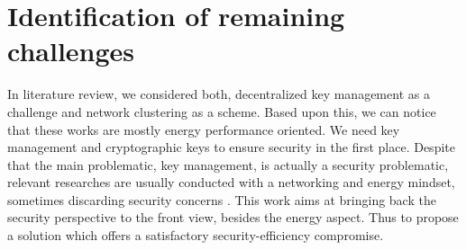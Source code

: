 \section{Identification of remaining challenges}

In literature review, we considered both, decentralized key management as a challenge and network clustering as a scheme. Based upon this, we can notice that these works are mostly energy performance oriented. We need key management and cryptographic keys to ensure security in the first place. Despite that the main problematic, key management, is actually a security problematic, relevant researches are usually conducted with a networking and energy mindset, sometimes discarding security concerns \cite{ziegeldorf_privacy_2014, zhang_iot_2014, khan_iot_2018}. This work aims at bringing back the security perspective to the front view, besides the energy aspect. Thus to propose a solution which offers a satisfactory security-efficiency compromise.